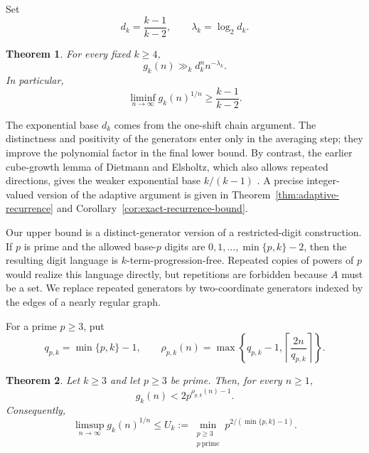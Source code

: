 \documentclass[11pt]{article}
\numberwithin{equation}{section}
\newtheorem{theorem}{Theorem}[section]
\theoremstyle{definition}
\theoremstyle{remark}
\newcommand{\ceil}[1]{\left\lceil #1\right\rceil}
\begin{document}
\bigskip
\noindent
Set
\begin{equation}\label{eq:dk-lambda}
d_k=\frac{k-1}{k-2},\qquad \lambda_k=\log_2d_k.
\end{equation}

\begin{theorem}\label{thm:main-lower-general}
For every fixed $k\ge4$,
\begin{equation}\label{eq:main-general-lower}
g_k(n)\gg_k d_k^n n^{-\lambda_k}.
\end{equation}
In particular,
\begin{equation}\label{eq:liminf-general-lower}
\liminf_{n\to\infty}g_k(n)^{1/n}\ge\frac{k-1}{k-2}.
\end{equation}
\end{theorem}

\smallskip
\noindent
The exponential base $d_k$ comes from the one-shift chain argument. The distinctness and positivity of the generators enter only in the averaging step; they improve the polynomial factor in the final lower bound. By contrast, the earlier cube-growth lemma of Dietmann and Elsholtz, which also allows repeated directions, gives the weaker exponential base $k/(k-1)$ \cite{DietmannElsholtz2015}. A precise integer-valued version of the adaptive argument is given in Theorem~\ref{thm:adaptive-recurrence} and Corollary~\ref{cor:exact-recurrence-bound}.

\bigskip
\noindent
Our upper bound is a distinct-generator version of a restricted-digit construction. If $p$ is prime and the allowed base-$p$ digits are $0,1,\ldots,\min\{p,k\}-2$, then the resulting digit language is $k$-term-progression-free. Repeated copies of powers of $p$ would realize this language directly, but repetitions are forbidden because $A$ must be a set. We replace repeated generators by two-coordinate generators indexed by the edges of a nearly regular graph.

\bigskip
\noindent
For a prime $p\ge3$, put
\begin{equation}\label{eq:q-rho-definition}
q_{p,k}=\min\{p,k\}-1,
\qquad
\rho_{p,k}(n)=\max\left\{q_{p,k}-1,\ceil{\frac{2n}{q_{p,k}}}\right\}.
\end{equation}

\begin{theorem}\label{thm:main-upper-general}
Let $k\ge3$ and let $p\ge3$ be prime. Then, for every $n\ge1$,
\begin{equation}\label{eq:finite-upper-general}
g_k(n)<2p^{\rho_{p,k}(n)-1}.
\end{equation}
Consequently,
\begin{equation}\label{eq:limsup-upper-general}
\limsup_{n\to\infty}g_k(n)^{1/n}
 \le U_k:=\min_{\substack{p\ge3\\p\ \mathrm{prime}}}p^{2/(\min\{p,k\}-1)}.
\end{equation}
\end{theorem}
\end{document}
